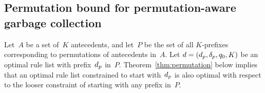 \subsection{Permutation bound for permutation-aware garbage collection}
\label{sec:permutation}

Let~$A$ be a set of~$K$ antecedents, and let~$P$ be the set of all
$K$-prefixes corresponding to permutations of antecedents in~$A$.
%
Let ${{d} = (d_p, \delta_p, q_0, K)}$ be an optimal rule list
with prefix~$d_p$ in~$P$.
%
Theorem~\ref{thm:permutation} below implies that
an optimal rule list constrained to start with~$d_p$
is also optimal with respect to the looser constraint of
starting with any prefix in~$P$.

